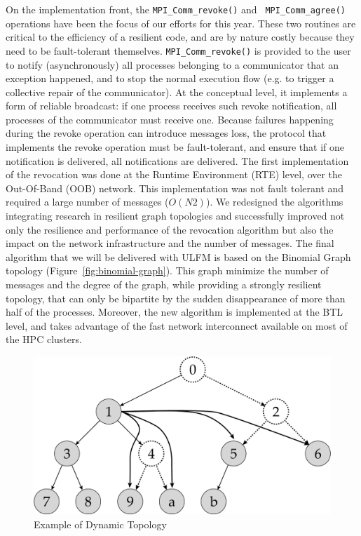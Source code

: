 On the implementation front, the {\tt MPI\_Comm\_revoke()} and {\tt
MPI\_Comm\_agree()} 
operations have been the focus of our efforts for this year. These two
routines are critical to the efficiency of a resilient code, and are
by nature costly because they need to be fault-tolerant
themselves. {\tt MPI\_Comm\_revoke()} is provided to the user to notify
(asynchronously) all processes belonging to a communicator that an
exception happened, and to stop the normal execution flow (e.g. to
trigger a collective repair of the communicator). At the conceptual
level, it implements a form of reliable broadcast: if one process
receives such revoke notification, all processes of the communicator
must receive one. Because failures happening during the revoke
operation can introduce messages loss, the protocol that implements
the revoke operation must be fault-tolerant, and ensure that if one
notification is delivered, all notifications are delivered. The first
implementation of the revocation was done at the Runtime Environment
(RTE) level, over the Out-Of-Band (OOB) network. This implementation
was not fault tolerant and required a large number of messages
($O(N2)$). We redesigned the algorithms integrating research in
resilient graph topologies and successfully improved not only the
resilience and performance of the revocation algorithm but also the
impact on the network infrastructure and the number of messages. The
final algorithm that we will be delivered with ULFM is based on the
Binomial Graph topology (Figure~\ref{fig:binomial-graph}). This graph
minimize the number of 
messages and the degree of the graph, while providing a strongly
resilient topology, that can only be bipartite by the sudden
disappearance of more than half of the processes. Moreover, the new
algorithm is implemented at the BTL level, and takes advantage of the
fast network interconnect available on most of the HPC clusters.

\begin{figure}[ht]
\begin{center}
\includegraphics[width=0.6\columnwidth]{Figs/DynamicTopology.pdf}
  \caption{Example of Dynamic Topology}
  \label{fig:dynamic-topo}
\end{center}
\end{figure}

